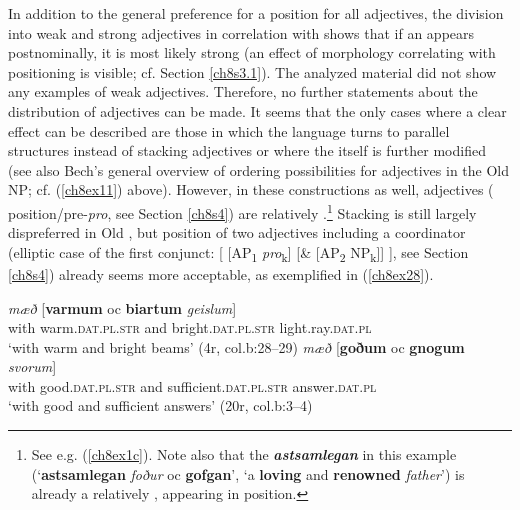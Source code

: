 \documentclass[output=paper,colorlinks,citecolor=brown]{langscibook}
\begin{document}
In addition to the general preference for a  position for all
adjectives, the division into weak and strong adjectives in correlation
with  shows that if an  appears postnominally,
it is most likely strong (an effect of morphology correlating with
positioning is visible; cf. Section \ref{ch8s3.1}). The analyzed  material
did not show any examples of  weak adjectives. Therefore, no
further statements about the distribution of  adjectives can be
made. It seems that the only cases where a clear  effect can be
described are those in which the language turns to parallel structures
instead of stacking adjectives or where the  itself is further
modified (see also Bech's \citeyear[4]{Bech17} general overview of ordering
possibilities for adjectives in the Old  NP; cf. (\ref{ch8ex11}) above).
However, in these constructions as well,  adjectives (
position/pre-\emph{pro}, see Section \ref{ch8s4}) are relatively
.\footnote{See e.g. (\ref{ch8ex1c}). Note also that the 
  \emph{\textbf{astsamlegan}} in this example (`\textbf{astsamlegan} \textit{foður} oc \textbf{gofgan}', `a \textbf{loving }and \textbf{renowned} \textit{father}') is already a relatively
   , appearing in  position.} Stacking is still
largely dispreferred in Old , but  position of two
adjectives including a coordinator (elliptic case of the first conjunct:
{[} {[}AP\textsubscript{1} \emph{pro}\textsubscript{k}{]} {[}\&
{[}AP\textsubscript{2} NP\textsubscript{k}{]}{]} {]}, see Section \ref{ch8s4}) already seems more acceptable, as exemplified in (\ref{ch8ex28}).

\begin{exe}
\ex\label{ch8ex28}
\begin{xlist}
\ex\label{ch8ex28a}
\gll \emph{mæð} {[}\textbf{varmum} oc \textbf{biartum} \textit{geislum}{]} \\
with warm.\textsc{dat.pl.str} and bright.\textsc{dat.pl.str} light.ray.\textsc{dat.pl}\\
\glt `with warm and bright beams' (4r, col.b:28--29)
\ex\label{ch8ex28b}
\gll \emph{mæð} {[}\textbf{goðum} oc \textbf{gnogum} \textit{svorum}{]} \\
with good.\textsc{dat.pl.str} and sufficient.\textsc{dat.pl.str} answer.\textsc{dat.pl}\\
\glt `with good and sufficient answers' (20r, col.b:3--4)
\end{xlist}
\end{exe}
\end{document}
